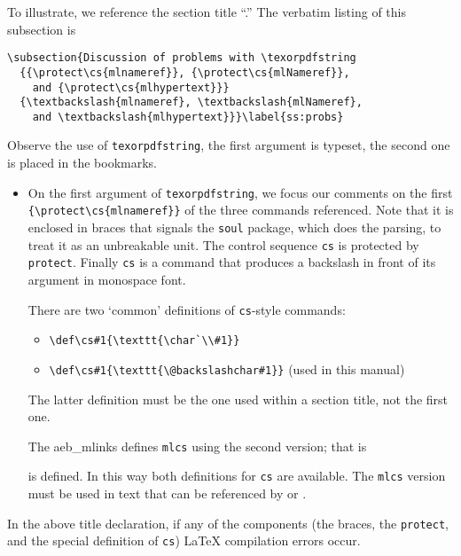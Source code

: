 \documentclass{article}
\makeatletter
\edef\amtIndent{\the\leftmargini}
\let\pkg\textsf
\let\opt\texttt
\def\cs#1{\texttt{\@backslashchar#1}}
\makeatother
\begin{document}
To illustrate, we reference the section title ``.'' The verbatim listing of this subsection is
\begin{Verbatim}[xleftmargin=\amtIndent,fontsize=\small,commandchars=!()]
\subsection{Discussion of problems with \texorpdfstring
  {{\protect\cs{mlnameref}}, {\protect\cs{mlNameref}},
    and {\protect\cs{mlhypertext}}}
  {\textbackslash{mlnameref}, \textbackslash{mlNameref},
    and \textbackslash{mlhypertext}}}\label{ss:probs}
\end{Verbatim}
Observe the use of \cs{texorpdfstring}, the first argument is typeset, the second
one is placed in the bookmarks.
\begin{itemize}
  \item On the first argument of \cs{texorpdfstring}, we focus our comments
      on the first \verb~{\protect\cs{mlnameref}}~ of the three commands
      referenced. Note that it is enclosed in braces that signals the
      \opt{soul} package, which does the parsing, to treat it as an
      unbreakable unit. The control sequence \cs{cs} is protected by
      \cs{protect}. Finally \cs{cs} is a command that produces a backslash in
      front of its argument in monospace font.

      There are two `common' definitions of \cs{cs}-style commands:
      \begin{itemize}
        \item \verb~\def\cs#1{\texttt{\char`\\#1}}~
        \item \verb~\def\cs#1{\texttt{\@backslashchar#1}}~ (used in this manual)
      \end{itemize}
      The latter definition must be the one used within a section title, not the first one.

      The \pkg{aeb\_mlinks} defines \cs{mlcs} using the second version; that
      is  is defined. In
      this way both definitions for \cs{cs} are available. The \cs{mlcs}
      version must be used in text that can be referenced by 
      or .
\end{itemize}
In the above title declaration, if any of the components (the braces, the \cs{protect}, and the special
definition of \cs{cs}) {\LaTeX} compilation errors occur.
\end{document}
